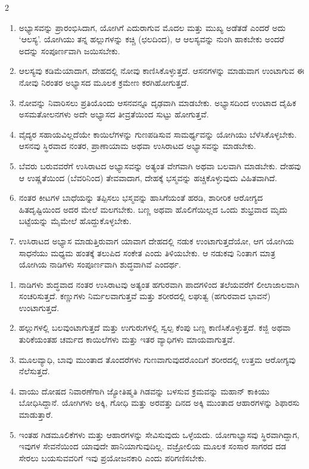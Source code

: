 \begin{multicols}{2}
\begin{kan}

\begin{enumerate}[nosep]
\item[1.] ಅಭ್ಯಾಸವನ್ನು ಪ್ರಾರಂಭಿಸಿದಾಗ, ಯೋಗಿಗೆ ಎದುರಾಗುವ ಮೊದಲ ಮತ್ತು ಮುಖ್ಯ ಅಡೆತಡೆ ಎಂದರೆ ಅದು ‘ಆಲಸ್ಯ’. ಯೋಗಿಯು ತನ್ನ ಹಲ್ಲುಗಳನ್ನು ಕಚ್ಚಿ (ಛಲದಿಂದ), ಆ ಆಲಸ್ಯವನ್ನು ನುಂಗಿ ಹಾಕಬೇಕು ಅಂದರೆ ಅದನ್ನು ಸಂಪೂರ್ಣವಾಗಿ ಜಯಿಸಬೇಕು.
\item[2.] ಆಲಸ್ಯವು ಕಡಿಮೆಯಾದಾಗ, ದೇಹದಲ್ಲಿ ನೋವು ಕಾಣಿಸಿಕೊಳ್ಳುತ್ತದೆ. ಆಸನಗಳನ್ನು ಮಾಡುವಾಗ ಉಂಟಾಗುವ ಈ ನೋವು ನಿರಂತರ ಅಭ್ಯಾಸದ ಮೂಲಕ ಕ್ರಮೇಣ ಕರಗಿಹೋಗುತ್ತದೆ.
\item[3.] ನೋವನ್ನು ನಿವಾರಿಸಲು ಪ್ರತಿಯೊಂದು ಆಸನವನ್ನೂ ದೃಢವಾಗಿ ಮಾಡಬೇಕು. ಅಭ್ಯಾಸದಿಂದ ಉಂಟಾದ ದೈಹಿಕ ಅಸಮತೋಲನಗಳು ಅದೇ ಅಭ್ಯಾಸದ ತೀವ್ರತೆಯಿಂದ ಸುಟ್ಟು ಹೋಗುತ್ತವೆ.
\item[4.] ವೈದ್ಯರ ಸಹಾಯವಿಲ್ಲದೆಯೇ ಕಾಯಿಲೆಗಳನ್ನು ಗುಣಪಡಿಸುವ ಸಾಮರ್ಥ್ಯವನ್ನು ಯೋಗಿಯು ಬೆಳೆಸಿಕೊಳ್ಳಬೇಕು. ಆಸನವು ಸ್ಥಿರವಾದ ನಂತರ, ಪ್ರಾಣಾಯಾಮ ಅಥವಾ ಉಸಿರಾಟದ ಅಭ್ಯಾಸವನ್ನು ಮಾಡಬೇಕು.
\item[5.] ಬೆವರು ಬರುವವರೆಗೆ ಉಸಿರಾಟದ ಅಭ್ಯಾಸವನ್ನು ಅತ್ಯಂತ ವೇಗವಾಗಿ ಅಥವಾ ಬಲವಾಗಿ ಮಾಡಬೇಕು. ದೇಹವು ಆ ಉಷ್ಣತೆಯಿಂದ (ಬೆವರಿನಿಂದ) ತೇವವಾದಾಗ, ದೇಹಕ್ಕೆ ಭಸ್ಮವನ್ನು ಹಚ್ಚಿಕೊಳ್ಳುವುದು ವಿಹಿತವಾಗಿದೆ.
\item[6.] ನಂತರ ಕೀಟಗಳ ಬಾಧೆಯನ್ನು ತಪ್ಪಿಸಲು ಭಸ್ಮವನ್ನು ಹಾಸಿಗೆಯಂತೆ ಹರಡಿ, ಶಾರೀರಿಕ ಆರೋಗ್ಯದ ಹಿತದೃಷ್ಟಿಯಿಂದ ಅದರ ಮೇಲೆ ಮಲಗಬೇಕು. ಬಣ್ಣ ಅಥವಾ ಹೊಲಿಗೆಯಿಲ್ಲದ ಒಂದು ಶುಭ್ರವಾದ ಮೃದು ಬಟ್ಟೆಯನ್ನು ಮೈಮೇಲೆ ಹೊದ್ದುಕೊಳ್ಳಬೇಕು.
\item[7.] ಉಸಿರಾಟದ ಅಭ್ಯಾಸ ಮಾಡುತ್ತಿರುವಾಗ ಯಾವಾಗ ದೇಹದಲ್ಲಿ ನಡುಕ ಉಂಟಾಗುತ್ತದೆಯೋ, ಆಗ ಯೋಗಿಯ ಸಾಧನೆಯು ಮಧ್ಯಮ ಹಂತಕ್ಕೆ ತಲುಪಿದ ಸಂಕೇತ ಎಂದು ತಿಳಿಯಬೇಕು. ಆ ನಡುಕವು ನಿಂತಾಗ ಮಾತ್ರ ಯೋಗಿಯ ನಾಡಿಗಳು ಸಂಪೂರ್ಣವಾಗಿ ಶುದ್ಧವಾಗಿವೆ ಎಂದರ್ಥ.
\end{enumerate}
\columnbreak


\begin{enumerate}[nosep]
\item[8.] ನಾಡಿಗಳು ಶುದ್ಧವಾದ ನಂತರ ಉಸಿರಾಟವು ಅತ್ಯಂತ ಹಗುರವಾಗಿ ಪಾದಗಳಿಂದ ತಲೆಯವರೆಗೆ ಲೀಲಾಜಾಲವಾಗಿ ಸಂಚರಿಸುತ್ತದೆ. ಕಣ್ಣುಗಳು ನಿರ್ಮಲವಾಗುತ್ತವೆ ಮತ್ತು ಶರೀರದಲ್ಲಿ ಲಘುತ್ವ (ಹಗುರವಾದ ಭಾವನೆ) ಉಂಟಾಗುತ್ತದೆ.
\item[9.] ಹಲ್ಲುಗಳಲ್ಲಿ ಬಲವುಂಟಾಗುತ್ತದೆ ಮತ್ತು ಉಗುರುಗಳಲ್ಲಿ ಸ್ವಲ್ಪ ಕೆಂಪು ಬಣ್ಣ ಕಾಣಿಸಿಕೊಳ್ಳುತ್ತದೆ. ಕಜ್ಜಿ ಅಥವಾ ತುರಿಕೆಯಂತಹ ಚರ್ಮದ ಕಾಯಿಲೆಗಳು ಮತ್ತು ಇತರ ವ್ಯಾಧಿಗಳು ಮಾಯವಾಗುತ್ತವೆ.
\item[10.] ಮೂಲವ್ಯಾಧಿ, ಬಾವು ಮುಂತಾದ ತೊಂದರೆಗಳು ಗುಣವಾಗುವುದರೊಂದಿಗೆ ಶರೀರದಲ್ಲಿ ಉತ್ತಮ ಆರೋಗ್ಯವು ನೆಲೆಸುತ್ತದೆ.
\item[11.] ವಾಯು ದೋಷದ ನಿವಾರಣೆಗಾಗಿ ಜ್ಯೋತಿಷ್ಮತಿ ಗಿಡವನ್ನು ಬಳಸುವ ಕ್ರಮವನ್ನು ಮಹಾನ್ ಕಾಕಿಯು ಬೋಧಿಸಿದ್ದಾನೆ. ಯೋಗಿಗಳು ಅಕ್ಕಿ, ಗೋಧಿ ಮತ್ತು ಅರವತ್ತು ದಿನದ ಅಕ್ಕಿ ಮುಂತಾದ ಆಹಾರಗಳನ್ನು ಶಿಫಾರಸು ಮಾಡುತ್ತಾರೆ.
\item[12.] ಇಂತಹ ಗಿಡಮೂಲಿಕೆಗಳು ಮತ್ತು ಆಹಾರಗಳನ್ನು ಸೇವಿಸುವುದು ಒಳ್ಳೆಯದು. ಯೋಗಾಭ್ಯಾಸವು ಸ್ಥಿರವಾಗಿದ್ದಾಗ, ಇವುಗಳ ಸೇವನೆಯಿಂದ ಯಾವುದೇ ಹಾನಿಯಾಗುವುದಿಲ್ಲ. ವಜ್ರೋಲಿಯ ಮೂಲಕ ಸಂಸಾರ ಸಾಗರದ ದಡ ಸೇರಲು ಬಯಸುವವರಿಗೆ ಇವು ಪ್ರಯೋಜನಕಾರಿ ಎಂದು ಪರಿಗಣಿಸಬೇಕು.
\end{enumerate}
\vskip 7pt


\end{kan}
\end{multicols}
